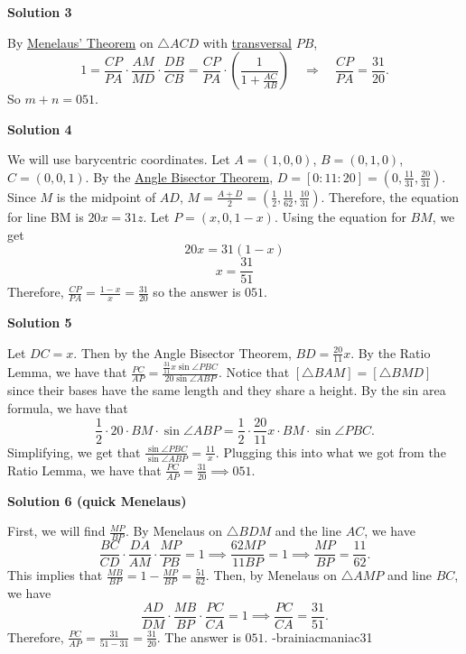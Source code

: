 \begin{enumerate}
 



\textbf{Solution 3}

By \href{https://artofproblemsolving.com/wiki/index.php?title=Menelaus\%27\_Theorem}{Menelaus' Theorem} on $\triangle ACD$ with \href{https://artofproblemsolving.com/wiki/index.php?title=Transversal}{transversal} $PB$, 
 \[1 = \frac{CP}{PA} \cdot \frac{AM}{MD} \cdot \frac{DB}{CB} = \frac{CP}{PA} \cdot \left(\frac{1}{1+\frac{AC}{AB}}\right) \quad \Longrightarrow \quad \frac{CP}{PA} = \frac{31}{20}.\] So $m+n = \boxed{051}$.

 



\textbf{Solution 4}

We will use barycentric coordinates. Let $A = (1, 0, 0)$, $B = (0, 1, 0)$, $C = (0, 0, 1)$. By the \href{https://artofproblemsolving.com/wiki/index.php?title=Angle\_Bisector\_Theorem}{Angle Bisector Theorem}, $D = [0:11:20] = \left(0, \frac{11}{31}, \frac{20}{31}\right)$. Since $M$ is the midpoint of $AD$, $M = \frac{A + D}{2} = \left(\frac{1}{2}, \frac{11}{62}, \frac{10}{31}\right)$. Therefore, the equation for line BM is $20x = 31z$. Let $P = (x, 0, 1-x)$. Using the equation for $BM$, we get 
 \[20x = 31(1-x)\]
 \[x = \frac{31}{51}\] Therefore, $\frac{CP}{PA} = \frac{1-x}{x} = \frac{31}{20}$ so the answer is $\boxed{051}$.

 



\textbf{Solution 5}

Let $DC=x$. Then by the Angle Bisector Theorem, $BD=\frac{20}{11}x$. By the Ratio Lemma, we have that $\frac{PC}{AP}=\frac{\frac{31}{11}x\sin\angle PBC}{20\sin\angle ABP}.$ Notice that $[\triangle BAM]=[\triangle BMD]$ since their bases have the same length and they share a height. By the sin area formula, we have that 
 \[\frac{1}{2}\cdot20\cdot BM\cdot \sin\angle ABP=\frac{1}{2}\cdot \frac{20}{11}x\cdot BM\cdot\sin\angle PBC.\] Simplifying, we get that $\frac{\sin\angle PBC}{\sin\angle ABP}=\frac{11}{x}.$ Plugging this into what we got from the Ratio Lemma, we have that $\frac{PC}{AP}=\frac{31}{20}\implies\boxed{051.}$




\textbf{Solution 6 (quick Menelaus)}

First, we will find $\frac{MP}{BP}$. By Menelaus on $\triangle BDM$ and the line $AC$, we have 
 \[\frac{BC}{CD}\cdot\frac{DA}{AM}\cdot\frac{MP}{PB}=1\implies \frac{62MP}{11BP}=1\implies \frac{MP}{BP}=\frac{11}{62}.\]This implies that $\frac{MB}{BP}=1-\frac{MP}{BP}=\frac{51}{62}$. Then, by Menelaus on $\triangle AMP$ and line $BC$, we have
 \[\frac{AD}{DM}\cdot\frac{MB}{BP}\cdot\frac{PC}{CA}=1\implies \frac{PC}{CA}=\frac{31}{51}.\]Therefore, $\frac{PC}{AP}=\frac{31}{51-31}=\frac{31}{20}.$ The answer is $\boxed{051}$. -brainiacmaniac31


\end{enumerate}
